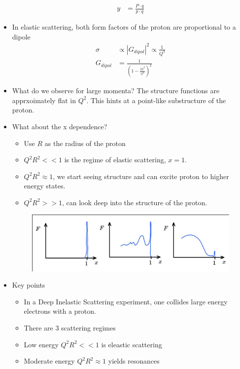 \documentclass[a4paper, 11pt, normalem]{report}
\begin{document}
\begin{itemize}
\begin{align}
            y &= \frac{P\cdot q}{p\cdot q}
        \end{align}
    \item In elastic scattering, both form factors of the proton are proportional to a dipole
        \begin{align}
            \sigma &\propto |G_{dipol}|^2 \propto \frac{1}{Q^3} \\
            G_{dipol} &= \frac{1}{\left(1-\frac{|q|^2}{a^2}\right)^2}
        \end{align}
    \item What do we observe for large momenta?
        The structure functions are apprxoimately flat in $Q^2$. 
        This hints at a point-like substructure of the proton.
    \item What about the x dependence?
        \begin{itemize}
            \item Use $R$ as the radius of the proton
            \item $Q^2R^2 << 1$ is the regime of elastic scattering, $x=1$.
            \item $Q^2R^2 \approx 1$, we start seeing structure and can excite proton to higher energy states.
            \item $Q^2R^2 >> 1$, can look deep into the structure of the proton.
        \end{itemize}
        \begin{figure}[H]
            \centering
            \includegraphics[scale=0.5]{forms.png}
        \end{figure}
    \item Key points
        \begin{itemize}
            \item In a Deep Inelastic Scattering experiment, one collides large energy electrons with a proton. 
            \item There are 3 scattering regimes
            \item Low energy $Q^2R^2 << 1$ is eleastic scattering
            \item Moderate energy $Q^2R^2 \approx 1$ yields resonances

\end{itemize}
\end{itemize}
\end{document}
